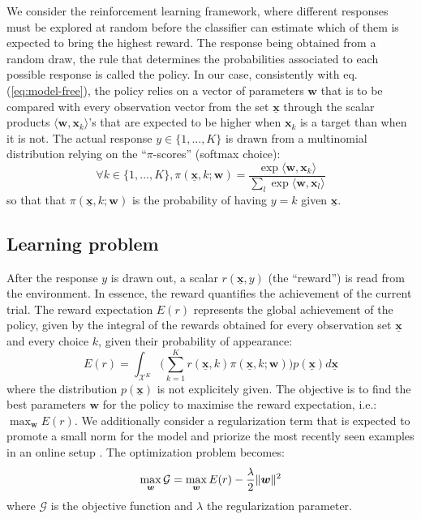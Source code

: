 \documentclass[conference]{IEEEtran}
\begin{document}
We consider the reinforcement learning framework, where different responses must be explored at random before the classifier can estimate which of
them is expected to bring the highest reward. 
The response being obtained from a random draw, the rule that determines the probabilities associated to each possible response is
called the policy.
In our case, consistently with eq. (\ref{eq:model-free}), the policy relies on a vector of parameters $\boldsymbol{w}$ 
that is to be compared with every observation vector from the set $\underline{\mathbf{x}}$
through the scalar products $\langle\boldsymbol{w},\boldsymbol{x}_k\rangle$'s
that are expected to be higher when $\boldsymbol{x}_k$ is a target than when it is not.
The actual response $y \in \{1,...,K\}$ is
drawn from a multinomial distribution relying on the ``$\pi$-scores'' (softmax choice):
\begin{equation}
\label{eq:softmax_multi}
 \forall k \in \{1,...,K\}, \pi(\underline{\mathbf{x}},k;\boldsymbol{w}) = \frac {\exp \langle\boldsymbol{w},\boldsymbol{x}_k\rangle}  {\sum_l \exp \langle\boldsymbol{w},\boldsymbol{x}_l\rangle}
\end{equation}
so that that $\pi(\underline{\mathbf{x}},k;\boldsymbol{w})$ is the probability of having $y=k$ given $\underline{\mathbf{x}}$. 

\subsection{Learning problem}
After the response $y$ is drawn out, a scalar $r(\underline{\mathbf{x}},y)$ (the ``reward'') 
is read from the environment. In essence, the reward quantifies the achievement of the current trial.
The reward expectation $E(r)$ represents the global
achievement of the policy, given by
the integral of the rewards obtained for every observation set $\underline{\mathbf{x}}$ 
and every choice $k$, given their probability of appearance: 
$$E(r) = \int_{\mathcal{X}^K}\Big( \sum_{k=1}^{K} r(\underline{\mathbf{x}},k) \pi(\underline{\mathbf{x}},k;\boldsymbol{w}) \Big)p(\underline{\mathbf{x}}) d\underline{\mathbf{x}}$$
where the distribution $p(\underline{\mathbf{x}})$ is not explicitely given. 
The objective is to find the best parameters $\boldsymbol{w}$ for the policy
to maximise the reward expectation, i.e.:
$\max_{\boldsymbol{w}} E(r)$. 
We additionally consider a regularization term that
is expected to promote a small norm for the model and priorize
the most recently seen examples in an online setup \cite{Kivinen08}. %
The optimization problem becomes:
\begin{equation}\label{eq:optim_regularized_pg}
  \max_{\boldsymbol{w}} \mathcal{G} = \max_{\boldsymbol{w}} E(r)-{\lambda \over 2} \Vert \boldsymbol{w} \Vert^2 
\end{equation}
where $\mathcal{G}$ is the objective function and $\lambda$ the regularization parameter.
\end{document}
